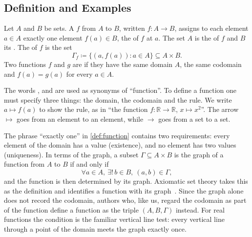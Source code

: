 \subsection{Definition and Examples}

\begin{definition}[Function]
\label{def:function}
Let $A$ and $B$ be sets. A  $f$ from $A$ to $B$, written $f\colon A\to B$, assigns to each element $a\in A$ exactly one element $f(a)\in B$, the  of $f$ at $a$. The set $A$ is the  of $f$ and $B$ its . The  of $f$ is the set
\[
\Gamma_f\coloneqq\{(a,f(a)): a\in A\}\subseteq A\times B .
\]
Two functions $f$ and $g$ are  if they have the same domain $A$, the same codomain and $f(a)=g(a)$ for every $a\in A$.
\end{definition}

The words ,  and  are used as synonyms of ``function''. To define a function one must specify three things: the domain, the codomain and the rule. We write $a\mapsto f(a)$ to show the rule, as in ``the function $f\colon\mathbb R\to\mathbb R$, $x\mapsto x^2$''. The arrow $\mapsto$ goes from an element to an element, while $\to$ goes from a set to a set.

The phrase ``exactly one'' in \cref{def:function} contains two requirements: every element of the domain has a value (existence), and no element has two values (uniqueness). In terms of the graph, a subset $\Gamma\subseteq A\times B$ is the graph of a function from $A$ to $B$ if and only if
\[
\forall a\in A,\ \exists!\,b\in B,\ (a,b)\in\Gamma ,
\]
and the function is then determined by its graph. Axiomatic set theory takes this as the definition and identifies a function with its graph~\cite{enderton1977sets}. Since the graph alone does not record the codomain, authors who, like us, regard the codomain as part of the function define a function as the triple $(A,B,\Gamma)$ instead. For real functions the condition is the familiar vertical line test: every vertical line through a point of the domain meets the graph exactly once.

